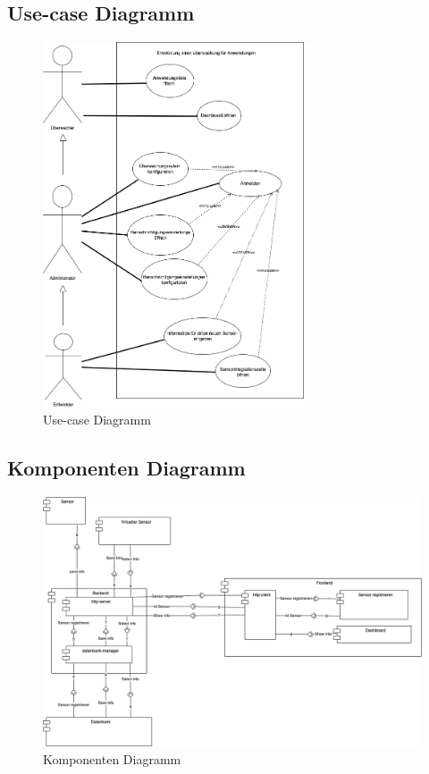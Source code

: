 \subsection{Use-case Diagramm}\label{appendix:a9}\par
\begin{figure}[htbp]
	\centering
	\includegraphics[width=300px]{img/anwendungsfalldiagramm.png}
	\caption{Use-case Diagramm}
\end{figure}
\clearpage



\subsection{Komponenten Diagramm}\label{appendix:a10}\par
\begin{figure}[htbp]
	\centering
	\includegraphics[width=1\textwidth]{img/komponent_diagram.png}
	\caption{Komponenten Diagramm}
\end{figure}
\clearpage

